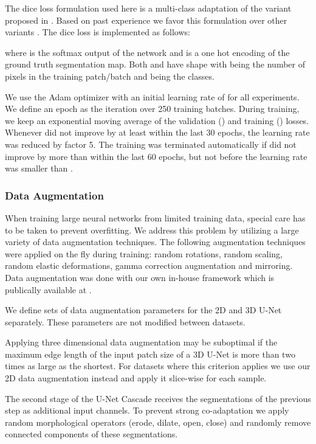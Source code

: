 \documentclass{templates/llncs}
\newcommand{\MYhref}[3][blue]{\href{#2}{\color{#1}{#3}}}
\begin{document}
    The dice loss formulation used here is a multi-class adaptation of the variant proposed in  \cite{drozdzal2016importance}. Based on past experience \cite{isensee2017automatic,isensee2017brain} we favor this formulation over other variants \cite{milletari2016v,sudre2017generalised}. The dice loss is implemented as follows:
    
    
    where  is the softmax output of the network and  is a one hot encoding of the ground truth segmentation map. Both  and  have shape  with  being the number of pixels in the training patch/batch and  being the classes.
    
    We use the Adam optimizer with an initial learning rate of  for all experiments. We define an epoch as the iteration over 250 training batches. During training, we keep an exponential moving average of the validation () and training () losses. Whenever  did not improve by at least  within the last 30 epochs, the learning rate was reduced by factor 5. The training was terminated automatically if  did not improve by more than  within the last 60 epochs, but not before the learning rate was smaller than .
    
    \subsubsection{Data Augmentation}
    When training large neural networks from limited training data, special care has to be taken to prevent overfitting. We address this problem by utilizing a large variety of data augmentation techniques. The following augmentation techniques were applied on the fly during training: random rotations, random scaling, random elastic deformations, gamma correction augmentation and mirroring. Data augmentation was done with our own in-house framework which is publically available at
    \MYhref{https://github.com/MIC-DKFZ/batchgenerators}{github.com/MIC-DKFZ/batchgenerators}.


    We define sets of data augmentation parameters for the 2D and 3D U-Net separately. These parameters are not modified between datasets.
    
    Applying three dimensional data augmentation may be suboptimal if the maximum edge length of the input patch size of a 3D U-Net is more than two times as large as the shortest. For datasets where this criterion applies we use our 2D data augmentation instead and apply it slice-wise for each sample.
    
    The second stage of the U-Net Cascade receives the segmentations of the previous step as additional input channels. To prevent strong co-adaptation we apply random morphological operators (erode, dilate, open, close) and randomly remove connected components of these segmentations.
    
\end{document}
